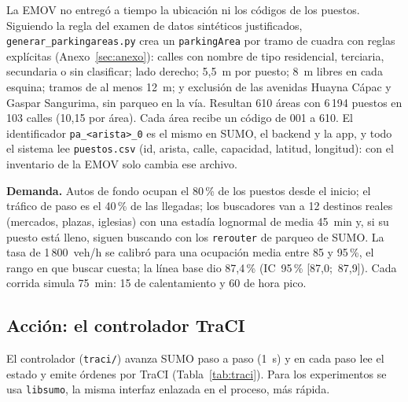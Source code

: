 \documentclass[conference]{IEEEtran}
\newcommand{\cod}[1]{\texttt{#1}}
\begin{document}
La EMOV no entregó a tiempo la ubicación ni los códigos de los puestos. Siguiendo la regla del examen de datos sintéticos justificados, \cod{generar\_parkingareas.py} crea un \cod{parkingArea} por tramo de cuadra con reglas explícitas (Anexo~\ref{sec:anexo}): calles con nombre de tipo residencial, terciaria, secundaria o sin clasificar; lado derecho; 5,5~m por puesto; 8~m libres en cada esquina; tramos de al menos 12~m; y exclusión de las avenidas Huayna Cápac y Gaspar Sangurima, sin parqueo en la vía. Resultan 610 áreas con 6\,194 puestos en 103 calles (10,15 por área). Cada área recibe un código de 001 a 610. El identificador \cod{pa\_<arista>\_0} es el mismo en SUMO, el backend y la app, y todo el sistema lee \cod{puestos.csv} (id, arista, calle, capacidad, latitud, longitud): con el inventario de la EMOV solo cambia ese archivo.

\textbf{Demanda.} Autos de fondo ocupan el 80\,\% de los puestos desde el inicio; el tráfico de paso es el 40\,\% de las llegadas; los buscadores van a 12 destinos reales (mercados, plazas, iglesias) con una estadía lognormal de media 45~min y, si su puesto está lleno, siguen buscando con los \cod{rerouter} de parqueo de SUMO. La tasa de 1\,800~veh/h se calibró para una ocupación media entre 85 y 95\,\%, el rango en que buscar cuesta; la línea base dio 87,4\,\% (IC~95\,\% [87,0;~87,9]). Cada corrida simula 75~min: 15 de calentamiento y 60 de hora pico.

\subsection{Acción: el controlador TraCI}
El controlador (\cod{traci/}) avanza SUMO paso a paso (1~s) y en cada paso lee el estado y emite órdenes por TraCI (Tabla~\ref{tab:traci}). Para los experimentos se usa \cod{libsumo}, la misma interfaz enlazada en el proceso, más rápida.
\end{document}
